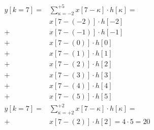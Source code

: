 \clearpage
\begin{align}
y[k=7] =& \sum\limits_{\kappa = -2}^{+5} x[7 -\kappa] \cdot h[\kappa] =\\
&x[7 -(-2)] \cdot h[-2]\nonumber\\
+&x[7 -(-1)] \cdot h[-1]\nonumber\\
+&x[7 -(0)] \cdot h[0]\nonumber\\
+&x[7 -(1)] \cdot h[1]\nonumber\\
+&x[7 -(2)] \cdot h[2]\nonumber\\
+&x[7 -(3)] \cdot h[3]\nonumber\\
+&x[7 -(4)] \cdot h[4]\nonumber\\
+&x[7 -(5)] \cdot h[5]\nonumber\\
y[k=7] =& \sum\limits_{\kappa = +2}^{+2} x[7 -\kappa] \cdot h[\kappa] =\nonumber\\
+&x[7 -(2)] \cdot h[2] = 4\cdot 5 = 20\nonumber
\end{align}







\newpage
